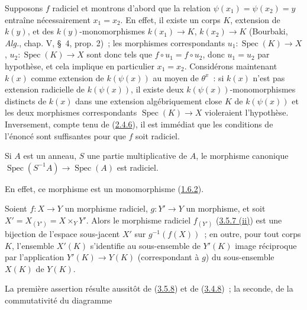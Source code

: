 Supposons $f$ radiciel et montrons d'abord que la relation
$\psi(x_1)=\psi(x_2)=y$ entraîne nécessairement $x_1=x_2$. En effet, il
existe un corps $K$, extension de $k(y)$, et des $k(y)$-monomorphismes
$k(x_1)\to K$, $k(x_2)\to K$ (Bourbaki, \emph{Alg.}, chap. V, \S~4,
prop. 2)~; les morphismes correspondants
$u_1:\operatorname{Spec}(K)\to X$, $u_2:\operatorname{Spec}(K)\to X$ sont
donc tels que $f\circ u_1=f\circ u_2$, donc $u_1=u_2$ par hypothèse, et cela
implique en particulier $x_1=x_2$. Considérons maintenant $k(x)$ comme
extension de $k(\psi(x))$ au moyen de $\theta^x$~: si $k(x)$ n'est pas
extension radicielle de $k(\psi(x))$, il existe deux
$k(\psi(x))$-monomorphismes distincts de $k(x)$ dans une extension
algébriquement close $K$ de $k(\psi(x))$ et les deux morphismes correspondants
$\operatorname{Spec}(K)\to X$ violeraient l'hypothèse. Inversement, compte
tenu de (\hyperref[I.2.4.6-fr]{2.4.6}), il est immédiat que les conditions de
l'énoncé sont suffisantes pour que $f$ soit radiciel.

\begin{corollary}[3.5.9]
\label{I.3.5.9-fr}
Si $A$ est un anneau, $S$ une partie multiplicative de $A$, le morphisme
canonique $\operatorname{Spec}(S^{-1}A)\to\operatorname{Spec}(A)$ est
radiciel.
\end{corollary}

En effet, ce morphisme est un monomorphisme
(\hyperref[I.1.6.2-fr]{1.6.2}).

\begin{corollary}[3.5.10]
\label{I.3.5.10-fr}
Soient $f:X\to Y$ un morphisme radiciel, $g:Y'\to Y$ un morphisme, et soit
$X'=X_{(Y')}=X\times_Y Y'$. Alors le morphisme radiciel $f_{(Y')}$
(\hyperref[I.3.5.7-fr]{3.5.7 (ii)}) est une bijection de l'espace sous-jacent
$X'$ sur $g^{-1}(f(X))$~; en outre, pour tout corps $K$, l'ensemble $X'(K)$
s'identifie au sous-ensemble de $Y'(K)$ image réciproque par l'application
$Y'(K)\to Y(K)$ (correspondant à $g$) du sous-ensemble $X(K)$ de $Y(K)$.
\end{corollary}

La première assertion résulte aussitôt de
(\hyperref[I.3.5.8-fr]{3.5.8}) et de
(\hyperref[I.3.4.8-fr]{3.4.8})~; la seconde, de la commutativité du diagramme
